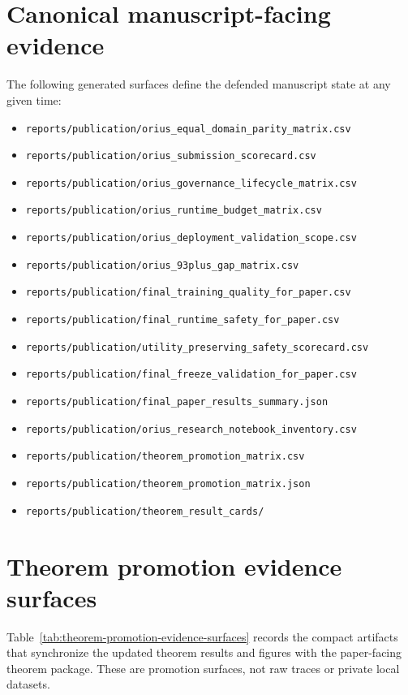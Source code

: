 \section{Canonical manuscript-facing evidence}
The following generated surfaces define the defended manuscript state at any given time:
\begin{itemize}
  \item \texttt{reports/publication/orius\_equal\_domain\_parity\_matrix.csv}
  \item \texttt{reports/publication/orius\_submission\_scorecard.csv}
  \item \texttt{reports/publication/orius\_governance\_lifecycle\_matrix.csv}
  \item \texttt{reports/publication/orius\_runtime\_budget\_matrix.csv}
  \item \texttt{reports/publication/orius\_deployment\_validation\_scope.csv}
  \item \texttt{reports/publication/orius\_93plus\_gap\_matrix.csv}
  \item \texttt{reports/publication/final\_training\_quality\_for\_paper.csv}
  \item \texttt{reports/publication/final\_runtime\_safety\_for\_paper.csv}
  \item \texttt{reports/publication/utility\_preserving\_safety\_scorecard.csv}
  \item \texttt{reports/publication/final\_freeze\_validation\_for\_paper.csv}
  \item \texttt{reports/publication/final\_paper\_results\_summary.json}
  \item \texttt{reports/publication/orius\_research\_notebook\_inventory.csv}
  \item \texttt{reports/publication/theorem\_promotion\_matrix.csv}
  \item \texttt{reports/publication/theorem\_promotion\_matrix.json}
  \item \texttt{reports/publication/theorem\_result\_cards/}
\end{itemize}

\section{Theorem promotion evidence surfaces}
Table~\ref{tab:theorem-promotion-evidence-surfaces} records the compact
artifacts that synchronize the updated theorem results and figures with the
paper-facing theorem package.  These are promotion surfaces, not raw traces or
private local datasets.

